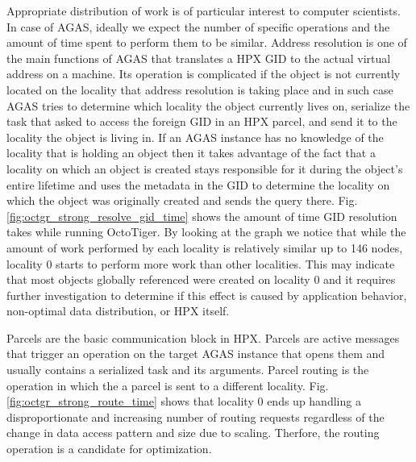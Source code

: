 Appropriate distribution of work is of particular interest to computer
scientists. In case of AGAS, ideally we expect the number of specific
operations and the amount of time spent to perform them to be similar. Address
resolution is one of the main functions of AGAS that translates a HPX GID to
the actual virtual address on a machine. Its operation is complicated if the
object is not currently located on the locality that address resolution is taking
place and in such case AGAS tries to determine which locality the object
currently lives on, serialize the task that asked to access the foreign GID in
an HPX parcel, and send it to the locality the object is living in. If an AGAS
instance has no knowledge of the locality that is holding an object then it
takes advantage of the fact that a locality on which an object is created stays
responsible for it during the object's entire lifetime and uses the metadata in
the GID to determine the locality on which the object was originally created and
sends the query there. Fig. \ref{fig:octgr_strong_resolve_gid_time} shows the
amount of time GID resolution takes while running OctoTiger. By looking at
the graph we notice that while the amount of work performed by each
locality is relatively similar up to 146 nodes, locality 0 starts to perform
more work than other localities. This may indicate that most objects globally
referenced were created on locality 0 and it requires further investigation to
determine if this effect is caused by application behavior, non-optimal data
distribution, or HPX itself.

Parcels are the basic communication block in HPX. Parcels are active messages
that trigger an operation on the target AGAS instance that opens them and
usually contains a serialized task and its arguments. Parcel routing is the
operation in which the a parcel is sent to a different locality. Fig.
\ref{fig:octgr_strong_route_time} shows that locality 0 ends up handling a
disproportionate and increasing number of routing requests regardless of the
change in data access pattern and size due to scaling. Therfore, the routing
operation is a candidate for optimization.

